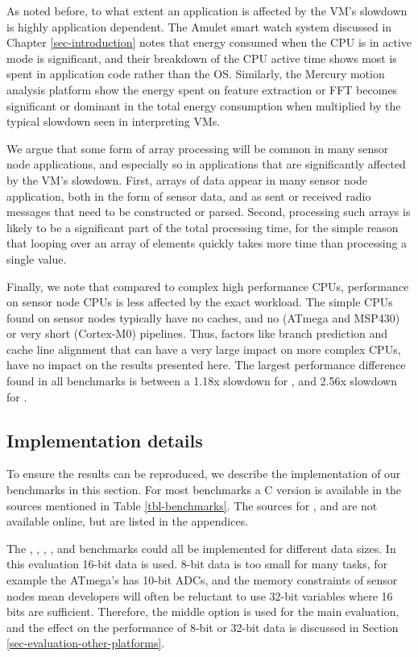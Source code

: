 


As noted before, to what extent an application is affected by the VM's slowdown is highly application dependent. The Amulet smart watch system discussed in Chapter \ref{sec-introduction} notes that energy consumed when the CPU is in active mode is significant, and their breakdown of the CPU active time shows most is spent in application code rather than the OS. Similarly, the Mercury motion analysis platform show the energy spent on feature extraction or FFT becomes significant or dominant in the total energy consumption when multiplied by the typical slowdown seen in interpreting VMs.

We argue that some form of array processing will be common in many sensor node applications, and especially so in applications that are significantly affected by the VM's slowdown. First, arrays of data appear in many sensor node application, both in the form of sensor data, and as sent or received radio messages that need to be constructed or parsed. Second, processing such arrays is likely to be a significant part of the total processing time, for the simple reason that looping over an array of elements quickly takes more time than processing a single value.

Finally, we note that compared to complex high performance CPUs, performance on sensor node CPUs is less affected by the exact workload. The simple CPUs found on sensor nodes typically have no caches, and no (ATmega and MSP430) or very short (Cortex-M0) pipelines. Thus, factors like branch prediction and cache line alignment that can have a very large impact on more complex CPUs, have no impact on the results presented here. The largest performance difference found in all benchmarks is between a 1.18x slowdown for , and 2.56x slowdown for .

\subsection{Implementation details}
To ensure the results can be reproduced, we describe the implementation of our benchmarks in this section. For most benchmarks a C version is available in the sources mentioned in Table \ref{tbl-benchmarks}. The sources for ,  and  are not available online, but are listed in the appendices.

The , , , , and  benchmarks could all be implemented for different data sizes. In this evaluation 16-bit data is used. 8-bit data is too small for many tasks, for example the ATmega's has 10-bit ADCs, and the memory constraints of sensor nodes mean developers will often be reluctant to use 32-bit variables where 16 bits are sufficient. Therefore, the middle option is used for the main evaluation, and the effect on the performance of 8-bit or 32-bit data is discussed in Section \ref{sec-evaluation-other-platforms}.

